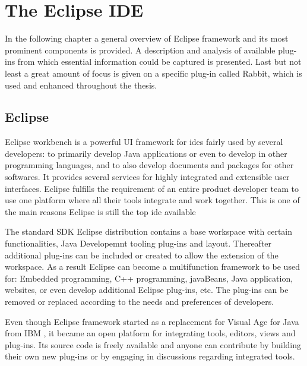 \chapter{The Eclipse IDE}\label{cha:TheEclipseIDE}

In the following chapter a general overview of Eclipse framework and its most prominent components is provided. A description and analysis of available plug-ins from which essential information could be captured is presented. Last but not least a great amount of focus is given on a specific plug-in called Rabbit, which is used and enhanced throughout the thesis.  


\section{Eclipse}
\label{sec:TheEclipseIDE:eclipse}
Eclipse workbench is a powerful UI framework for \gls{ide}s fairly used by several developers: to primarily develop Java applications or even to develop in other programming languages, and to also develop documents and packages for other softwares. It provides several services for highly integrated and extensible user interfaces. Eclipse fulfills the requirement of an entire product developer team to use one platform where all their tools integrate and work together. This is one of the main reasons Eclipse is still the top \gls{ide} available 

The standard SDK Eclipse distribution contains a base workspace with certain functionalities, Java Developemnt tooling plug-ins and layout. Thereafter additional plug-ins can be included or created to allow the extension of the workspace. As a result Eclipse can become a multifunction framework to be used for: Embedded programming, C++ programming, javaBeans, Java application, websites, or even develop additional Eclipse plug-ins, etc. The plug-ins can be removed or replaced according to the needs and preferences of developers.

Even though Eclipse framework started as a replacement for Visual Age for Java from IBM , it became an open platform for integrating tools, editors, views and plug-ins. Its source code is freely available and anyone can 
contribute by building their own new plug-ins or by engaging in discussions regarding integrated tools.

